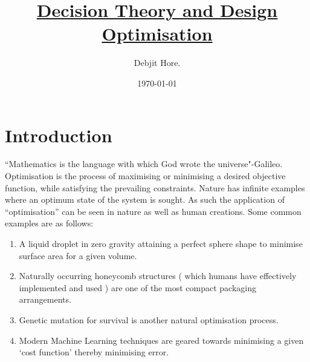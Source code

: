 \documentclass[12pt,a4paper,titlepage]{article}
\title{\Huge \underline{ Decision Theory and Design Optimisation}}
\author{Debjit Hore.}
\date{\today}
\begin{document}
\maketitle
\mbox{}

\printnomenclature

\clearpage
\tableofcontents

\clearpage
\section{Introduction}
``Mathematics is the language with which God wrote the universe"-Galileo.\\[1\baselineskip]
Optimisation is the process of maximising or minimising a desired objective function, while satisfying the prevailing constraints. Nature has infinite examples where an optimum state of the system is sought. As such the application of ``optimisation'' can be seen in nature as well as human creations. Some common examples are as follows:
{\begin{enumerate}
    \item A liquid droplet in zero gravity attaining a perfect sphere shape to minimise surface area for a given volume.
    \item Naturally occurring honeycomb structures ( which humans have effectively implemented and used ) are one of the most compact packaging arrangements.\
    \item Genetic mutation for survival is another natural optimisation process.
    \item Modern Machine Learning techniques are geared towards minimising a given `cost function' thereby minimising error.
\end{enumerate}}
\end{document}
